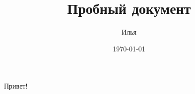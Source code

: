 \documentclass[a4paper]{article}
\author{Илья}
\title{Пробный документ}
\date{\today}
\begin{document}
  \maketitle
  
  Привет!
\end{document}
